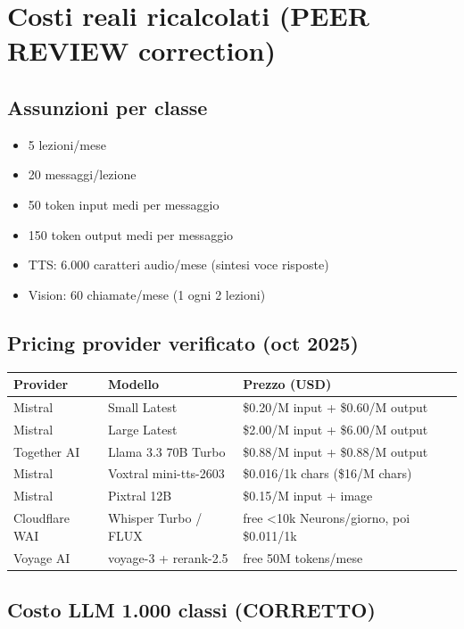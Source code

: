 \documentclass[12pt,a4paper]{article}
\begin{document}
\section{Costi reali ricalcolati (PEER REVIEW correction)}

\subsection*{Assunzioni per classe}

\begin{itemize}[leftmargin=*]
  \item 5 lezioni/mese
  \item 20 messaggi/lezione
  \item 50 token input medi per messaggio
  \item 150 token output medi per messaggio
  \item TTS: 6.000 caratteri audio/mese (sintesi voce risposte)
  \item Vision: 60 chiamate/mese (1 ogni 2 lezioni)
\end{itemize}

\subsection*{Pricing provider verificato (oct 2025)}

\begin{center}
\begin{tabular}{lll}
\toprule
\textbf{Provider} & \textbf{Modello} & \textbf{Prezzo (USD)} \\
\midrule
Mistral & Small Latest          & \$0.20/M input + \$0.60/M output \\
Mistral & Large Latest          & \$2.00/M input + \$6.00/M output \\
Together AI & Llama 3.3 70B Turbo & \$0.88/M input + \$0.88/M output \\
Mistral & Voxtral mini-tts-2603 & \$0.016/1k chars (\$16/M chars) \\
Mistral & Pixtral 12B           & \$0.15/M input + image \\
Cloudflare WAI & Whisper Turbo / FLUX & free <10k Neurons/giorno, poi \$0.011/1k \\
Voyage AI & voyage-3 + rerank-2.5 & free 50M tokens/mese \\
\bottomrule
\end{tabular}
\end{center}

\subsection*{Costo LLM 1.000 classi (CORRETTO)}
\end{document}
